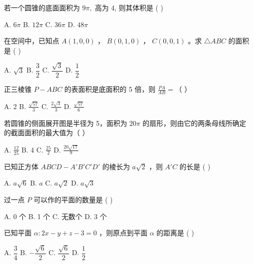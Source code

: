\documentclass[11pt, a4paper]{article}
\begin{document}
\begin{baitap}[6]
若一个圆锥的底面面积为 $9\pi,$ 高为 4, 则其体积是 ( )
\par\vspace{3pt}
\noindent A. $6\pi$ \quad B. $12\pi$ \quad C. $36\pi$ \quad D. $48\pi$
\end{baitap}

\begin{baitap}[7]
在空间中，已知点 $A(1,0,0)$ ， $B(0,1,0)$ ， $C(0,0,1)$ 。求 $\triangle ABC$ 的面积是 ( )
\par\vspace{3pt}
\noindent A. $\sqrt{3}$ \quad B. $\dfrac{3}{2}$ \quad C. $\dfrac{\sqrt{3}}{2}$ \quad D. $\dfrac{1}{2}$
\end{baitap}

\begin{baitap}[8]
正三棱锥 $P-ABC$ 的表面积是底面积的 5 倍，则 $\frac{PA}{AB}=$（ ）
\par\vspace{3pt}
\noindent A. 2 \quad B. $\frac{\sqrt{57}}{3}$ \quad C. $\frac{2\sqrt{3}}{3}$ \quad D. $\frac{\sqrt{57}}{6}$
\end{baitap}

\begin{baitap}[9]
若圆锥的侧面展开图是半径为 5，面积为 $20\pi$ 的扇形，则由它的两条母线所确定的截面面积的最大值为（ ）
\par\vspace{3pt}
\noindent A. $\frac{12}{25}$ \quad B. 4 \quad C. $\frac{25}{2}$ \quad D. $\frac{20\sqrt{17}}{9}$
\end{baitap}

\begin{baitap}[10]
已知正方体 $ABCD - A'B'C'D'$ 的棱长为 $a\sqrt{2}$ ，则 $A'C$ 的长是 ( )
\par\vspace{3pt}
\noindent A. $a\sqrt{6}$ \quad B. $a$ \quad C. $a\sqrt{2}$ \quad D. $a\sqrt{3}$
\end{baitap}

\begin{baitap}[11]
过一点 $P$ 可以作的平面的数量是 ( )
\par\vspace{3pt}
\noindent A. 0 个 \quad B. 1 个 \quad C. 无数个 \quad D. 3 个
\end{baitap}

\begin{baitap}[12]
已知平面 $\alpha: 2x - y + z - 3 = 0$ ，则原点到平面 $\alpha$ 的距离是 ( )
\par\vspace{3pt}
\noindent A. $\dfrac{3}{4}$ \quad B. $-\dfrac{\sqrt{6}}{2}$ \quad C. $\dfrac{\sqrt{6}}{2}$ \quad D. $\dfrac{1}{2}$
\end{baitap}
\end{document}
